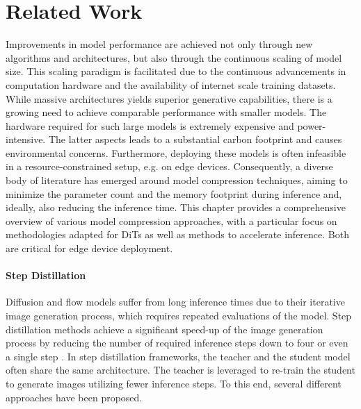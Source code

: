 \chapter{Related Work}

Improvements in model performance are achieved not only through new algorithms and architectures, but also through the continuous scaling of model size. This scaling paradigm is facilitated due to the continuous advancements in computation hardware and the availability of internet scale training datasets. While massive architectures yields superior generative capabilities, there is a growing need to achieve comparable performance with smaller models. The hardware required for such large models is extremely expensive and power-intensive. The latter aspects leads to a substantial carbon footprint and causes environmental concerns. Furthermore, deploying these models is often infeasible in a resource-constrained setup, e.g. on edge devices. Consequently, a diverse body of literature has emerged around model compression techniques, aiming to minimize the parameter count and the memory footprint during inference and, ideally, also reducing the inference time. This chapter provides a comprehensive overview of various model compression approaches, with a particular focus on methodologies adapted for \gls{DiT}s as well as methods to accelerate inference. Both are critical for edge device deployment.

 \subsubsection{Step Distillation}
Diffusion and flow models suffer from long inference times due to their iterative image generation process, which requires repeated evaluations of the model. Step distillation methods achieve a significant speed-up of the image generation process by reducing the number of required inference steps down to four or even a single step \cite{LADD,ADD,ProgressiveDistillation,DistillationMatching,ConsistencyModel,LatentConsistencyModel}. In step distillation frameworks, the teacher and the student model often share the same architecture. The teacher is leveraged to re-train the student to generate images utilizing fewer inference steps. To this end, several different approaches have been proposed.

